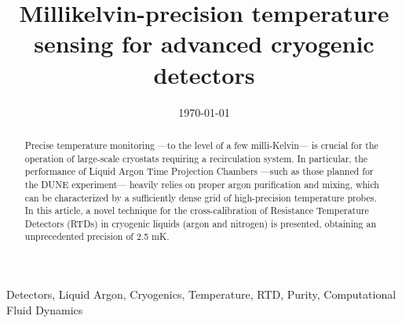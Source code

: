 \documentclass[review,1p,number,sort&compress]{elsarticle}
\begin{document}
\title{Millikelvin-precision temperature sensing for advanced cryogenic detectors}


\date{\today}

\begin{abstract}
Precise temperature monitoring  ---to the level of a few milli-Kelvin--- is crucial for the operation of large-scale cryostats requiring a recirculation system. In particular, the performance of Liquid Argon Time Projection Chambers ---such as those planned for the DUNE experiment--- heavily relies on proper argon purification and mixing, which can be characterized by a sufficiently dense grid of high-precision temperature probes. In this article, a novel technique for the cross-calibration of Resistance Temperature Detectors (RTDs) in cryogenic liquids (argon and nitrogen) is presented, obtaining an unprecedented precision of 2.5 mK.
\end{abstract}

\begin{keyword}
Detectors, Liquid Argon, Cryogenics, Temperature, RTD, Purity, Computational Fluid Dynamics
\end{keyword}

\maketitle











\end{document}
